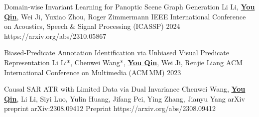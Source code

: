   \cvPub
    {Domain-wise Invariant Learning for Panoptic Scene Graph Generation}
    {Li Li, \underline{\textbf{You Qin}}, Wei Ji, Yuxiao Zhou, Roger Zimmermann}
    {IEEE International Conference on Acoustics, Speech \& Signal Processing (ICASSP) 2024}
    {}
    {https://arxiv.org/abs/2310.05867}{}{}{}{}

  \cvPub
    {Biased-Predicate Annotation Identification via Unbiased Visual Predicate Representation}
    {Li Li*, Chenwei Wang*, \underline{\textbf{You Qin}}, Wei Ji, Renjie Liang}
    {ACM International Conference on Multimedia (ACM\,MM) 2023}
    {}
    {}{}{}{}{}

  \cvPub
    {Causal SAR ATR with Limited Data via Dual Invariance}
    {Chenwei Wang, \underline{\textbf{You Qin}}, Li Li, Siyi Luo, Yulin Huang, Jifang Pei, Ying Zhang, Jianyu Yang}
    {arXiv preprint arXiv:2308.09412}
    {Preprint}
    {https://arxiv.org/abs/2308.09412}{}{}{}{}

\cvPubListEnd
